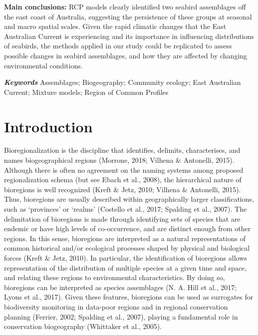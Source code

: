 \documentclass{article}
\begin{document}
\begin{linenumbers}
\textbf{Main conclusions:} RCP models clearly identified two seabird assemblages off the east coast of Australia, suggesting the persistence of these groups at seasonal and macro spatial scales. Given the rapid climatic changes that the East Australian Current is experiencing and its importance in influencing distributions of seabirds, the methods applied in our study could be replicated to assess possible changes in seabird assemblages, and how they are affected by changing environmental conditions.

\textbf{\emph{Keywords}} Assemblages; Biogeography; Community ecology; East Australian Current; Mixture models; Region of Common Profiles

\newpage

\hypertarget{introduction}{%
\section{Introduction}\label{introduction}}

Bioregionalization is the discipline that identifies, delimits, characterises, and names biogeographical regions (Morrone, 2018; Vilhena \& Antonelli, 2015). Although there is often no agreement on the naming systems among proposed regionalization schema (but see Ebach et al., 2008), the hierarchical nature of bioregions is well recognized (Kreft \& Jetz, 2010; Vilhena \& Antonelli, 2015). Thus, bioregions are usually described within geographically larger classifications, such as `provinces' or `realms' (Costello et al., 2017; Spalding et al., 2007). The delimitation of bioregions is made through identifying sets of species that are endemic or have high levels of co-occurrence, and are distinct enough from other regions. In this sense, bioregions are interpreted as a natural representations of common historical and/or ecological processes shaped by physical and biological forces (Kreft \& Jetz, 2010). In particular, the identification of bioregions allows representation of the distribution of multiple species at a given time and space, and relating these regions to environmental characteristics. By doing so, bioregions can be interpreted as species assemblages (N. A. Hill et al., 2017; Lyons et al., 2017). Given these features, bioregions can be used as surrogates for biodiversity monitoring in data-poor regions and in regional conservation planning (Ferrier, 2002; Spalding et al., 2007), playing a fundamental role in conservation biogeography (Whittaker et al., 2005).


\end{linenumbers}
\end{document}
